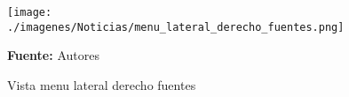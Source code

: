 \begin{figure}[!htb]
  \begin{center}
\texttt{[image: ./imagenes/Noticias/menu\_lateral\_derecho\_fuentes.png]}
    \caption{Vista menu lateral derecho fuentes}
    \label{fig:Vista_menu_lateral_derecho_fuentes}
    \textbf{Fuente:}  Autores
  \end{center}
\end{figure}
